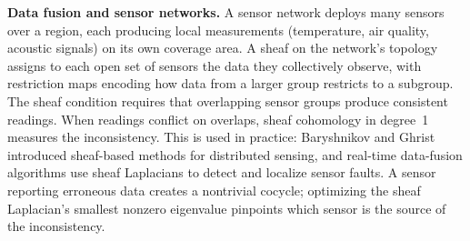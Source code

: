 \theoryapplications
{}
\noindent\textbf{Data fusion and sensor networks.} A sensor network deploys many sensors over a region, each producing local measurements (temperature, air quality, acoustic signals) on its own coverage area. A sheaf on the network's topology assigns to each open set of sensors the data they collectively observe, with restriction maps encoding how data from a larger group restricts to a subgroup. The sheaf condition requires that overlapping sensor groups produce consistent readings. When readings conflict on overlaps, sheaf cohomology in degree~1 measures the inconsistency. This is used in practice: Baryshnikov and Ghrist introduced sheaf-based methods for distributed sensing, and real-time data-fusion algorithms use sheaf Laplacians to detect and localize sensor faults. A sensor reporting erroneous data creates a nontrivial cocycle; optimizing the sheaf Laplacian's smallest nonzero eigenvalue pinpoints which sensor is the source of the inconsistency.

